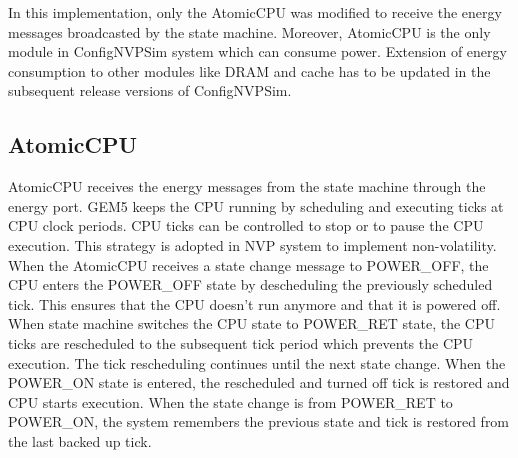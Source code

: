 \documentclass[conference]{IEEEtran}
\begin{document}
In this implementation, only the AtomicCPU was modified to receive the energy messages broadcasted by the state machine. Moreover, AtomicCPU is the only module in ConfigNVPSim system which can consume power. Extension of energy consumption to other modules like DRAM and cache has to be updated in the subsequent release versions of ConfigNVPSim. 

\subsection{AtomicCPU}
AtomicCPU receives the energy messages from the state machine through the energy port. GEM5 keeps the CPU running by scheduling and executing ticks at CPU clock periods. CPU ticks can be controlled to stop or to pause the CPU execution. This strategy is adopted in NVP system to implement non-volatility. 
When the AtomicCPU receives a state change message to POWER\_OFF, the CPU enters the POWER\_OFF state by descheduling the previously scheduled tick. This ensures that the CPU doesn't run anymore and that it is powered off. When state machine switches the CPU state to POWER\_RET state, the CPU ticks are rescheduled to the subsequent tick period which prevents the CPU execution. The tick rescheduling continues until the next state change. When the POWER\_ON state is entered, the rescheduled and turned off tick is restored and CPU starts execution. 
When the state change is from POWER\_RET to POWER\_ON, the system remembers the previous state and tick is restored from the last backed up tick.
\end{document}
